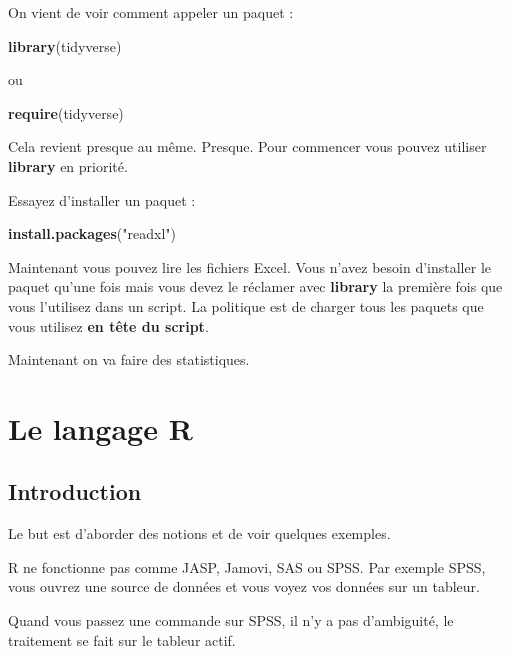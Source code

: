 \documentclass[
]{book}
\newenvironment{Shaded}{\begin{snugshade}}{\end{snugshade}}
\newcommand{\FunctionTok}[1]{\textcolor[rgb]{0.13,0.29,0.53}{\textbf{#1}}}
\newcommand{\NormalTok}[1]{#1}
\newcommand{\StringTok}[1]{\textcolor[rgb]{0.31,0.60,0.02}{#1}}
\begin{document}
On vient de voir comment appeler un paquet :

\begin{Shaded}
\begin{Highlighting}[]
\FunctionTok{library}\NormalTok{(tidyverse)}
\end{Highlighting}
\end{Shaded}

ou

\begin{Shaded}
\begin{Highlighting}[]
\FunctionTok{require}\NormalTok{(tidyverse)}
\end{Highlighting}
\end{Shaded}

Cela revient presque au même. Presque. Pour commencer vous pouvez utiliser
\textbf{library} en priorité.

Essayez d'installer un paquet :

\begin{Shaded}
\begin{Highlighting}[]
\FunctionTok{install.packages}\NormalTok{(}\StringTok{"readxl"}\NormalTok{)}
\end{Highlighting}
\end{Shaded}

Maintenant vous pouvez lire les fichiers Excel. Vous n'avez besoin d'installer
le paquet qu'une fois mais vous devez le réclamer avec \textbf{library} la première
fois que vous l'utilisez dans un script. La politique est de charger tous les
paquets que vous utilisez \textbf{en tête du script}.

Maintenant on va faire des statistiques.

\hypertarget{le-langage-r}{%
\chapter{Le langage R}\label{le-langage-r}}

\hypertarget{introduction}{%
\section{Introduction}\label{introduction}}

Le but est d'aborder des notions et de voir quelques exemples.

R ne fonctionne pas comme JASP, Jamovi, SAS ou SPSS. Par exemple SPSS, vous ouvrez une
source de données et vous voyez vos données sur un tableur.

Quand vous passez une commande sur SPSS, il n'y a pas d'ambiguité, le traitement
se fait sur le tableur actif.
\end{document}
